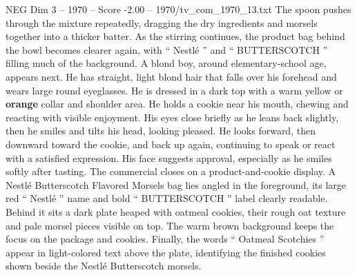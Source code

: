 \begin{textsample}{NEG Dim 3 – 1970 – Score -2.00 – 1970/tv\_com\_1970\_13.txt}
The spoon pushes through the mixture repeatedly, dragging the dry ingredients and morsels together into a thicker batter.
As the stirring continues, the product bag behind the bowl becomes clearer again, with “ Nestlé ” and “ BUTTERSCOTCH ” filling much of the background.
A blond boy, around elementary-school age, appears next.
He has straight, light blond hair that falls over his forehead and wears large round eyeglasses.
He is dressed in a dark top with a warm yellow or \textbf{orange} collar and shoulder area.
He holds a cookie near his mouth, chewing and reacting with visible enjoyment.
His eyes close briefly as he leans back slightly, then he smiles and tilts his head, looking pleased.
He looks forward, then downward toward the cookie, and back up again, continuing to speak or react with a satisfied expression.
His face suggests approval, especially as he smiles softly after tasting.
The commercial closes on a product-and-cookie display.
A Nestlé Butterscotch Flavored Morsels bag lies angled in the foreground, its large red “ Nestlé ” name and bold “ BUTTERSCOTCH ” label clearly readable.
Behind it sits a dark plate heaped with oatmeal cookies, their rough oat texture and pale morsel pieces visible on top.
The warm brown background keeps the focus on the package and cookies.
Finally, the words “ Oatmeal Scotchies ” appear in light-colored text above the plate, identifying the finished cookies shown beside the Nestlé Butterscotch morsels.

\end{textsample}
